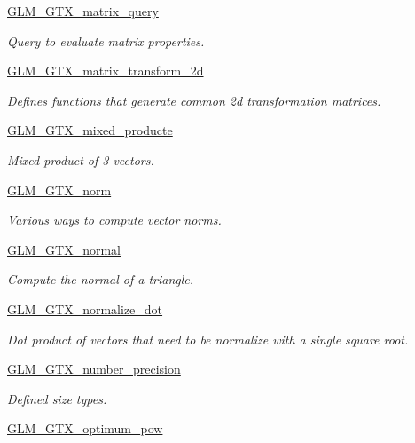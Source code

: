 \begin{DoxyCompactItemize}
\mbox{\hyperlink{group__gtx__matrix__query}{G\+L\+M\+\_\+\+G\+T\+X\+\_\+matrix\+\_\+query}}
\begin{DoxyCompactList}\small\item\em Query to evaluate matrix properties. \end{DoxyCompactList}\item 
\mbox{\hyperlink{group__gtx__matrix__transform__2d}{G\+L\+M\+\_\+\+G\+T\+X\+\_\+matrix\+\_\+transform\+\_\+2d}}
\begin{DoxyCompactList}\small\item\em Defines functions that generate common 2d transformation matrices. \end{DoxyCompactList}\item 
\mbox{\hyperlink{group__gtx__mixed__product}{G\+L\+M\+\_\+\+G\+T\+X\+\_\+mixed\+\_\+producte}}
\begin{DoxyCompactList}\small\item\em Mixed product of 3 vectors. \end{DoxyCompactList}\item 
\mbox{\hyperlink{group__gtx__norm}{G\+L\+M\+\_\+\+G\+T\+X\+\_\+norm}}
\begin{DoxyCompactList}\small\item\em Various ways to compute vector norms. \end{DoxyCompactList}\item 
\mbox{\hyperlink{group__gtx__normal}{G\+L\+M\+\_\+\+G\+T\+X\+\_\+normal}}
\begin{DoxyCompactList}\small\item\em Compute the normal of a triangle. \end{DoxyCompactList}\item 
\mbox{\hyperlink{group__gtx__normalize__dot}{G\+L\+M\+\_\+\+G\+T\+X\+\_\+normalize\+\_\+dot}}
\begin{DoxyCompactList}\small\item\em Dot product of vectors that need to be normalize with a single square root. \end{DoxyCompactList}\item 
\mbox{\hyperlink{group__gtx__number__precision}{G\+L\+M\+\_\+\+G\+T\+X\+\_\+number\+\_\+precision}}
\begin{DoxyCompactList}\small\item\em Defined size types. \end{DoxyCompactList}\item 
\mbox{\hyperlink{group__gtx__optimum__pow}{G\+L\+M\+\_\+\+G\+T\+X\+\_\+optimum\+\_\+pow}}

\end{DoxyCompactItemize}
